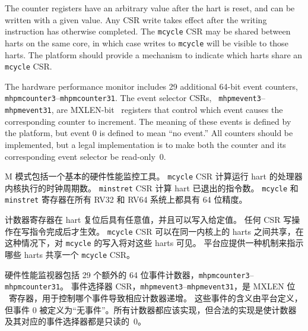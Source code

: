 The counter registers have an arbitrary value after the hart is reset, and
can be written with a given value. Any CSR write takes effect after
the writing instruction has otherwise completed.
The {\tt mcycle} CSR may be shared between harts on the same core, in which
case writes to {\tt mcycle} will be visible to those harts.
The platform should provide a mechanism to indicate which harts share an {\tt
mcycle} CSR.

The hardware performance monitor includes 29 additional 64-bit event counters, {\tt
mhpmcounter3}--{\tt mhpmcounter31}.  The event selector CSRs, {\tt
mhpmevent3}--{\tt mhpmevent31}, are MXLEN-bit \warl\ registers that control which event
causes the corresponding counter to increment.  The meaning of these events is
defined by the platform, but event 0 is defined to mean ``no event.''
All counters should be implemented, but a legal implementation is to make
both the counter and its corresponding event selector be read-only~0.
\fi

M 模式包括一个基本的硬件性能监控工具。 {\tt mcycle} CSR 计算运行 hart 的处理器内核执行的时钟周期数。 {\tt minstret} CSR 计算 hart 已退出的指令数。 {\tt mcycle} 和 {\tt minstret} 寄存器在所有 RV32 和 RV64 系统上都具有 64 位精度。

计数器寄存器在 hart 复位后具有任意值，并且可以写入给定值。 任何 CSR 写操作在写指令完成后才生效。 {\tt mcycle} CSR 可以在同一内核上的 harts 之间共享，在这种情况下，对 {\tt mcycle} 的写入将对这些 harts 可见。 平台应提供一种机制来指示哪些 harts 共享一个 {\tt mcycle} CSR。

硬件性能监视器包括 29 个额外的 64 位事件计数器，{\tt mhpmcounter3}--{\tt mhpmcounter31}。 事件选择器 CSR，{\tt mhpmevent3}--{\tt mhpmevent31}，是 MXLEN 位 \warl\ 寄存器，用于控制哪个事件导致相应计数器递增。 这些事件的含义由平台定义，但事件 0 被定义为“无事件”。所有计数器都应该实现，但合法的实现是使计数器及其对应的事件选择器都是只读的~0。

